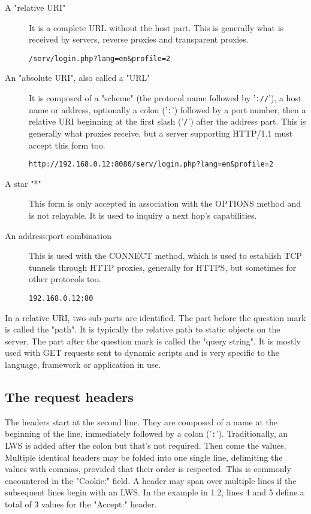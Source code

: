 \begin{description}
\item[A "relative URI"]
    It is a complete URL without the host part. This is generally what is
    received by servers, reverse proxies and transparent proxies.
    
    \verb|/serv/login.php?lang=en&profile=2|

\item[An "absolute URI", also called a "URL"]
    It is composed of a "scheme" (the protocol name followed by '\verb|://|'), a host
    name or address, optionally a colon ('\verb|:|') followed by a port number, then
    a relative URI beginning at the first slash ('\verb|/|') after the address part.
    This is generally what proxies receive, but a server supporting HTTP/1.1
    must accept this form too.
    
    \verb|http://192.168.0.12:8080/serv/login.php?lang=en&profile=2|

\item[A star "*"]
    This form is only accepted in association with the OPTIONS
    method and is not relayable. It is used to inquiry a next hop's
    capabilities.

\item[An address:port combination]
    This is used with the CONNECT method, which is used to establish TCP
    tunnels through HTTP proxies, generally for HTTPS, but sometimes for
    other protocols too.
    
    \verb|192.168.0.12:80|
\end{description}

In a relative URI, two sub-parts are identified. The part before the question
mark is called the "path". It is typically the relative path to static objects
on the server. The part after the question mark is called the "query string".
It is mostly used with GET requests sent to dynamic scripts and is very
specific to the language, framework or application in use.

\subsection{The request headers}
The headers start at the second line. They are composed of a name at the
beginning of the line, immediately followed by a colon ('\verb|:|'). Traditionally,
an LWS is added after the colon but that's not required. Then come the values.
Multiple identical headers may be folded into one single line, delimiting the
values with commas, provided that their order is respected. This is commonly
encountered in the "Cookie:" field. A header may span over multiple lines if
the subsequent lines begin with an LWS. In the example in 1.2, lines 4 and 5
define a total of 3 values for the "Accept:" header.

